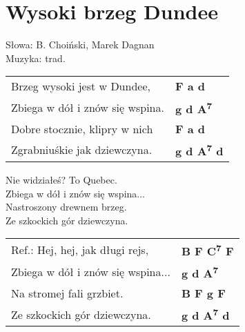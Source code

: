 \section{Wysoki brzeg Dundee}

Słowa: B. Choiński, Marek Dagnan\\
Muzyka:  trad.

\vspace{2em}
\begin{tabular}{@{}p{6cm}@{}l@{}}
Brzeg wysoki jest w Dundee, & \bfseries  F a d \\
Zbiega w dół i znów się wspina. & \bfseries  g d A\textsuperscript{7} \\
Dobre stocznie, klipry w nich & \bfseries  F a d \\
Zgrabniuśkie jak dziewczyna. & \bfseries  g d A\textsuperscript{7} d \\
\end{tabular}

\vspace{1em}
Nie widziałeś? To Quebec. \\
Zbiega w dół i znów się wspina... \\
Nastroszony drewnem brzeg. \\
Ze szkockich gór dziewczyna. \\

\begin{tabular}{@{}p{6cm}@{}l@{}}
Ref.: Hej, hej, jak długi rejs, & \bfseries  B F C\textsuperscript{7} F \\
Zbiega w dół i znów się wspina... & \bfseries  g d A\textsuperscript{7} \\
Na stromej fali grzbiet. & \bfseries  B F g F \\
Ze szkockich gór dziewczyna. & \bfseries  g d A\textsuperscript{7} d \\
\end{tabular}

